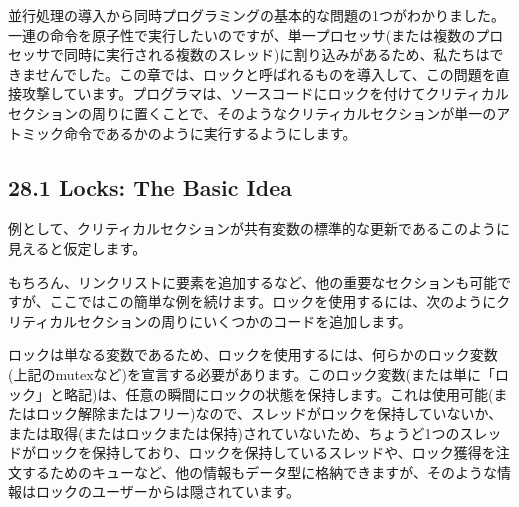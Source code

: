 並行処理の導入から同時プログラミングの基本的な問題の1つがわかりました。一連の命令を原子性で実行したいのですが、単一プロセッサ(または複数のプロセッサで同時に実行される複数のスレッド)に割り込みがあるため、私たちはできませんでした。この章では、ロックと呼ばれるものを導入して、この問題を直接攻撃しています。プログラマは、ソースコードにロックを付けてクリティカルセクションの周りに置くことで、そのようなクリティカルセクションが単一のアトミック命令であるかのように実行するようにします。

\hypertarget{locks-the-basic-idea}{%
\subsection*{28.1 Locks: The Basic Idea}\label{locks-the-basic-idea}}

例として、クリティカルセクションが共有変数の標準的な更新であるこのように見えると仮定します。

\begin{Shaded}
\begin{Highlighting}[]
\NormalTok{;}
\end{Highlighting}
\end{Shaded}

もちろん、リンクリストに要素を追加するなど、他の重要なセクションも可能ですが、ここではこの簡単な例を続けます。ロックを使用するには、次のようにクリティカルセクションの周りにいくつかのコードを追加します。

\begin{Shaded}
\begin{Highlighting}[]
\NormalTok{;}
\end{Highlighting}
\end{Shaded}

ロックは単なる変数であるため、ロックを使用するには、何らかのロック変数(上記のmutexなど)を宣言する必要があります。このロック変数(または単に「ロック」と略記)は、任意の瞬間にロックの状態を保持します。これは使用可能(またはロック解除またはフリー)なので、スレッドがロックを保持していないか、または取得(またはロックまたは保持)されていないため、ちょうど1つのスレッドがロックを保持しており、ロックを保持しているスレッドや、ロック獲得を注文するためのキューなど、他の情報もデータ型に格納できますが、そのような情報はロックのユーザーからは隠されています。


